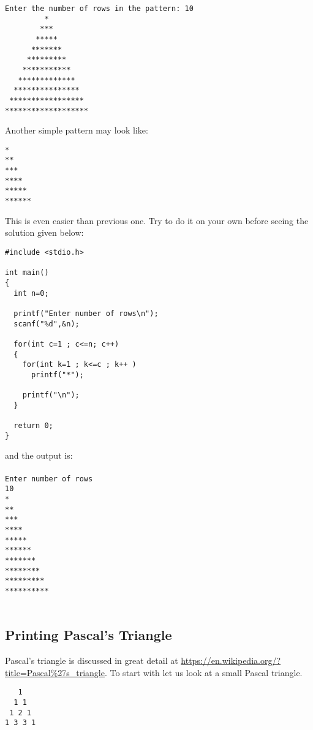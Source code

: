 \begin{verbatim}
Enter the number of rows in the pattern: 10
         *
        ***
       *****
      *******
     *********
    ***********
   *************
  ***************
 *****************
*******************
\end{verbatim}
Another simple pattern may look like:

\begin{verbatim}
*
**
***
****
*****
******
\end{verbatim}
This is even easier than previous one. Try to do it on your own before seeing
the solution given below:

\begin{verbatim}
#include <stdio.h>
 
int main()
{
  int n=0;
 
  printf("Enter number of rows\n");
  scanf("%d",&n);
 
  for(int c=1 ; c<=n; c++)
  {
    for(int k=1 ; k<=c ; k++ )
      printf("*");
 
    printf("\n");
  }
  
  return 0;
}
\end{verbatim}
and the output is:
\\\\\texttt{Enter number of rows\\
10\\
*\\
**\\
***\\
****\\
*****\\
******\\
*******\\
********\\
*********\\
**********\\\\}

\subsection{Printing Pascal's Triangle}
Pascal's triangle is discussed in great detail at
\url{https://en.wikipedia.org/?title=Pascal\%27s\_triangle}. To start with let
us look at a small Pascal triangle.

\begin{verbatim}
   1
  1 1
 1 2 1
1 3 3 1
\end{verbatim}

